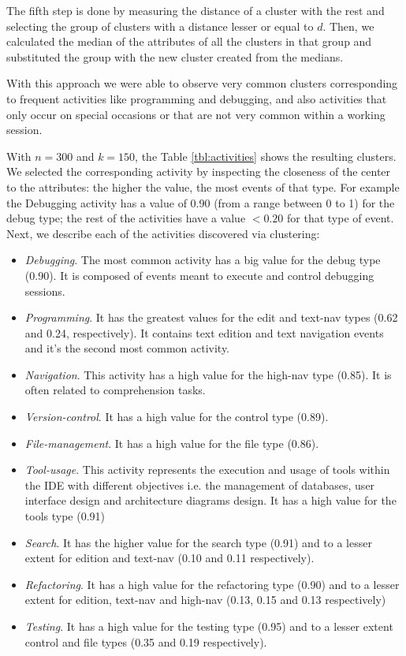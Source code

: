 The fifth step is done by measuring the distance of a cluster with the rest and selecting the group of clusters with a distance lesser or equal to $d$. Then, we calculated the median of the attributes of all the clusters in that group and substituted the group with the new cluster created from the medians. 

With this approach we were able to observe very common clusters corresponding to frequent activities like programming and debugging, and also activities that only occur on special occasions or that are not very common within a working session.


With $n=300$ and $k=150$, the Table \ref{tbl:activities} shows the resulting clusters. We selected the corresponding activity by inspecting the closeness of the center to the attributes: the higher the value, the most events of that type. For example the Debugging activity has a value of 0.90 (from a range between 0 to 1) for the debug type; the rest of the activities have a value $<0.20$ for that type of event. Next, we describe each of the activities discovered via clustering:

\begin{itemize}
	\item \emph{Debugging}. The most common activity has a big value for the debug type (0.90). It is composed of events meant to execute and control debugging sessions.
	\item \emph{Programming}. It has the greatest values for the edit and text-nav types (0.62 and 0.24, respectively). It contains text edition and text navigation events and it's the second most common activity.
	\item \emph{Navigation}. This activity has a high value for the high-nav type (0.85). It is often related to comprehension tasks.
	\item \emph{Version-control}. It has a high value for the control type (0.89).
	\item \emph{File-management}. It has a high value for the file type (0.86).
	\item \emph{Tool-usage}. This activity represents the execution and usage of tools within the IDE with different objectives i.e. the management of databases, user interface design and architecture diagrams design. It has a high value for the tools type (0.91)
	\item \emph{Search}. It has the higher value for the search type (0.91) and to a lesser extent for edition and text-nav (0.10 and 0.11 respectively).
	\item \emph{Refactoring}. It has a high value for the refactoring type (0.90) and to a lesser extent for edition, text-nav and high-nav (0.13, 0.15 and 0.13 respectively)
	\item \emph{Testing}. It has a high value for the testing type (0.95) and to a lesser extent control and file types (0.35 and 0.19 respectively).
\end{itemize}

